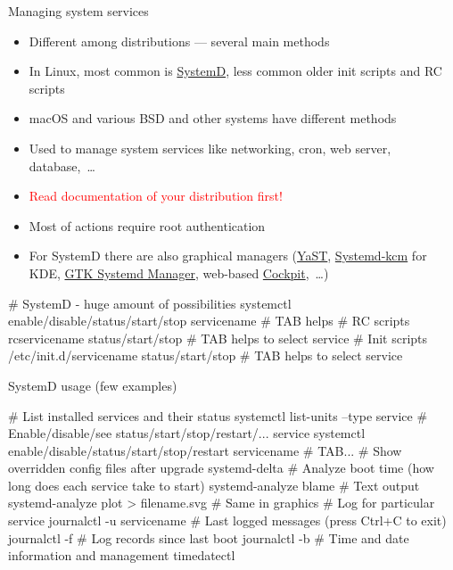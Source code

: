 \documentclass[compress, xelatex, 11pt, xcolor=svgnames, aspectratio=169, url={hyphens, lowtilde}]{beamer}
\renewcommand{\alert}[1]{\textcolor{red}{#1}}
\begin{document}
\begin{frame}[fragile]{Managing system services}
	\begin{itemize}
		\item Different among distributions --- several main methods
		\item In Linux, most common is \href{https://wiki.freedesktop.org/www/Software/systemd/}{SystemD}, less common older init scripts and RC scripts
		\item macOS and various BSD and other systems have different methods
		\item Used to manage system services like networking, cron, web server, database,~\ldots
		\item \alert{Read documentation of your distribution first!}
		\item Most of actions require root authentication
		\item For SystemD there are also graphical managers (\href{https://doc.opensuse.org/documentation/leap/reference/html/book-reference/cha-systemd.html#sec-boot-runlevel-edit}{YaST}, \href{https://store.kde.org/p/1127873/}{Systemd-kcm} for KDE, \href{https://github.com/GuillaumeGomez/systemd-manager}{GTK Systemd Manager}, web-based \href{https://cockpit-project.org/}{Cockpit},~\ldots)
	\end{itemize}
	\vfill
	\begin{bashcode}
    # SystemD - huge amount of possibilities
    systemctl enable/disable/status/start/stop servicename # TAB helps
    # RC scripts
    rcservicename status/start/stop # TAB helps to select service
    # Init scripts
    /etc/init.d/servicename status/start/stop # TAB helps to select service
	\end{bashcode}
\end{frame}

\begin{frame}[fragile]{SystemD usage (few examples)}
	\begin{bashcode}
    # List installed services and their status
    systemctl list-units --type service
    # Enable/disable/see status/start/stop/restart/... service
    systemctl enable/disable/status/start/stop/restart servicename # TAB...
    # Show overridden config files after upgrade
    systemd-delta
    # Analyze boot time (how long does each service take to start)
    systemd-analyze blame # Text output
    systemd-analyze plot > filename.svg # Same in graphics
    # Log for particular service
    journalctl -u servicename
    # Last logged messages (press Ctrl+C to exit)
    journalctl -f
    # Log records since last boot
    journalctl -b
    # Time and date information and management
    timedatectl
	\end{bashcode}
\end{frame}
\end{document}
